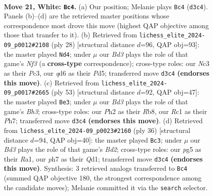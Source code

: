 \documentclass[11pt]{article}
\begin{document}
\begin{figure}[p]
\label{fig:thought-m38}
\end{figure}

\clearpage

\begin{figure}[p]\centering
\begin{subfigure}{0.46\textwidth}\centering
\resizebox{\linewidth}{!}{%
\newchessgame
\chessboard[
  setfen={r1b3k1/pp1n3p/2pqr1p1/6p1/3Pp3/2NB1PP1/PP3K1P/2RQR3 w - - 0 21},
  showmover=false,
  pgfstyle=straightmove, color=movearrow, markmove={d3-c4}
]}
\caption{}
\end{subfigure}\hfill
\begin{subfigure}{0.46\textwidth}\centering
\resizebox{\linewidth}{!}{%
\newchessgame
\chessboard[
  setfen={rn2qrk1/ppp4p/3p2p1/3P1b2/2P1pp2/2PB1N1P/P4PP1/R2QR1K1 w - - 2 15},
  showmover=false,
  pgfstyle=straightmove, color=movearrow, markmove={f3-d4}
]}
\caption{}
\end{subfigure}
\\[4pt]
\begin{subfigure}{0.46\textwidth}\centering
\resizebox{\linewidth}{!}{%
\newchessgame
\chessboard[
  setfen={1r1q1rk1/7p/p5pb/3PpP2/1p1p4/1P1P2PP/P2NQR1K/R7 b - - 0 27},
  showmover=false,
  pgfstyle=straightmove, color=movearrow, markmove={h6-e3}
]}
\caption{}
\end{subfigure}\hfill
\begin{subfigure}{0.46\textwidth}\centering
\resizebox{\linewidth}{!}{%
\newchessgame
\chessboard[
  setfen={r2r2k1/ppp3p1/2n3qp/5p2/4p3/P2P2PP/1PPB1P2/R2QR1K1 w - - 0 19},
  showmover=false,
  pgfstyle=straightmove, color=movearrow, markmove={d2-c3}
]}
\caption{}
\end{subfigure}
\caption{\textbf{Move 21, White: \texttt{Bc4}.} (a) Our position; Melanie plays \texttt{Bc4} (\texttt{d3c4}). Panels (b)--(d) are the retrieved master positions whose correspondence most drove this move (highest QAP objective among those that transfer to it). (b) Retrieved from \texttt{lichess\_elite\_2024-09\_p0012\#2108} (ply 28) [structural distance $d$=96, QAP obj=93]: the master played \texttt{Nd4}; under $\mu$ our \emph{Bd3} plays the role of that game's \emph{Nf3} (a \textbf{cross-type} correspondence); cross-type roles: our \emph{N}c3 as their \emph{P}c3, our \emph{q}d6 as their \emph{P}d5; transferred move \texttt{d3c4} \textbf{(endorses this move)}. (c) Retrieved from \texttt{lichess\_elite\_2024-09\_p0017\#2665} (ply 53) [structural distance $d$=92, QAP obj=47]: the master played \texttt{Be3}; under $\mu$ our \emph{Bd3} plays the role of that game's \emph{Bh3}; cross-type roles: our \emph{P}h2 as their \emph{R}b8, our \emph{R}c1 as their \emph{P}h7; transferred move \texttt{d3c4} \textbf{(endorses this move)}. (d) Retrieved from \texttt{lichess\_elite\_2024-09\_p0023\#2160} (ply 36) [structural distance $d$=94, QAP obj=40]: the master played \texttt{Bc3}; under $\mu$ our \emph{Bd3} plays the role of that game's \emph{Bd2}; cross-type roles: our \emph{p}g5 as their \emph{R}a1, our \emph{p}h7 as their \emph{Q}d1; transferred move \texttt{d3c4} \textbf{(endorses this move)}. Synthesis: 3 retrieved analogs transferred to \texttt{Bc4} (summed QAP objective 180, the strongest correspondence among the candidate moves); Melanie committed it via the \texttt{search} selector.}

\end{figure}
\end{document}
